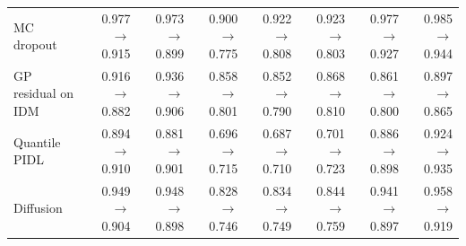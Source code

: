 \begin{table}[htbp]
\begin{tabular}{lrrrrrrr}
MC dropout & 0.977 $\rightarrow$ 0.915 & 0.973 $\rightarrow$ 0.899 & 0.900 $\rightarrow$ 0.775 & 0.922 $\rightarrow$ 0.808 & 0.923 $\rightarrow$ 0.803 & 0.977 $\rightarrow$ 0.927 & 0.985 $\rightarrow$ 0.944 \\
GP residual on IDM & 0.916 $\rightarrow$ 0.882 & 0.936 $\rightarrow$ 0.906 & 0.858 $\rightarrow$ 0.801 & 0.852 $\rightarrow$ 0.790 & 0.868 $\rightarrow$ 0.810 & 0.861 $\rightarrow$ 0.800 & 0.897 $\rightarrow$ 0.865 \\
Quantile PIDL & 0.894 $\rightarrow$ 0.910 & 0.881 $\rightarrow$ 0.901 & 0.696 $\rightarrow$ 0.715 & 0.687 $\rightarrow$ 0.710 & 0.701 $\rightarrow$ 0.723 & 0.886 $\rightarrow$ 0.898 & 0.924 $\rightarrow$ 0.935 \\
Diffusion & 0.949 $\rightarrow$ 0.904 & 0.948 $\rightarrow$ 0.898 & 0.828 $\rightarrow$ 0.746 & 0.834 $\rightarrow$ 0.749 & 0.844 $\rightarrow$ 0.759 & 0.941 $\rightarrow$ 0.897 & 0.958 $\rightarrow$ 0.919 \\
\bottomrule
\end{tabular}
\end{table}

